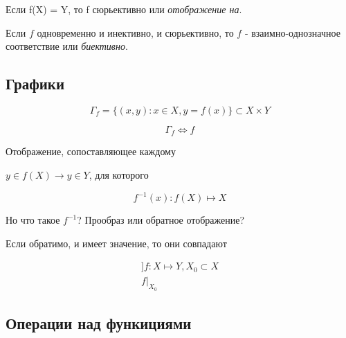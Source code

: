 \documentclass[12pt, a4paper]{article}
\begin{document}
    \begin{definition}
      Если f(X) = Y, то f сюрьективно или \textit{отображение на}.
    \end{definition}

    \begin{definition}
      Если $f$ одновременно и инективно, и сюрьективно, 
      то $f$ - взаимно-однозначное соответствие или \textit{биективно}.
    \end{definition}


    \subsection{Графики}
    \begin{definition}
      \begin{equation}
        \Gamma_f = \{(x, y): x \in X, y = f(x)\} \subset X \times Y
      \end{equation}
    \end{definition}

    \begin{theorem}
      \begin{equation}
        \Gamma_f \Longleftrightarrow f
      \end{equation}
    \end{theorem}

    \begin{definition}
      Отображение, сопоставляющее каждому 

      $y \in f(X) \longrightarrow y \in Y$, для которого   
    \end{definition}
    
    \begin{equation}
      f^{-1}(x): f(X) \mapsto X
    \end{equation}

    Но что такое $f^{-1}$? Прообраз или обратное отображение?
    
    Если обратимо, и имеет значение, то они совпадают

    \begin{definition}
      \begin{gather}
        ]f: X \mapsto Y, X_0 \subset X \\
        f|_{X_0}
      \end{gather}
    \end{definition}


    \subsection{Операции над функициями}
\end{document}
